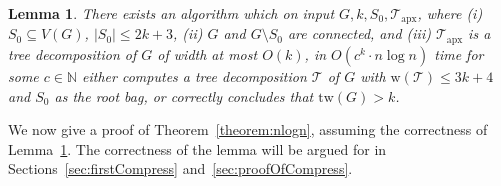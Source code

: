 \documentclass[a4paper,11pt]{article}
\newtheorem{lemma}{Lemma}[section]
\theoremstyle{definition}
\theoremstyle{remark}
\newcommand{\td}{\mathcal{T}} \newcommand{\tw}{\mathrm{tw}} \newcommand{\w}{\mathrm{w}}
\newcommand{\apx}{\textrm{apx}}
\begin{document}
\begin{lemma}\label{lemma:nlogn-compression}
  There exists an algorithm which on input $G,k,S_0,\td_\apx$, where
  (i) $S_0\subseteq V(G)$, $|S_0|\leq 2k+3$, (ii) $G$ and $G \setminus
  S_0$ are connected, and (iii) $\td_\apx$ is a tree decomposition of
  $G$ of width at most $O(k)$, in $O(c^k\cdot n \log n)$ time for some
  $c \in \mathbb{N}$ either computes a tree decomposition $\td$ of $G$
  with $\w(\td) \leq 3k+4$ and $S_0$ as the root bag, or correctly
  concludes that $\tw(G)>k$.
\end{lemma}

We now give a proof of Theorem~\ref{theorem:nlogn}, assuming the
correctness of Lemma~\ref{lemma:nlogn-compression}.  The correctness
of the lemma will be argued for in Sections~\ref{sec:firstCompress}
and~\ref{sec:proofOfCompress}.
 
\end{document}
